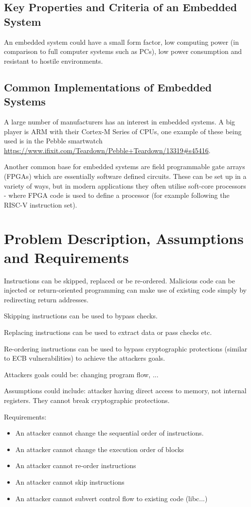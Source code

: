 \subsection{Key Properties and Criteria of an Embedded System}\label{propertiesEmbeddedSystems}
An embedded system could have a small form factor, low computing power (in comparison to full computer systems such as PCs), low power consumption and resistant to hostile environments.

\subsection{Common Implementations of Embedded Systems}\label{implementationsEmbeddedSystems}
A large number of manufacturers has an interest in embedded systems. A big player is ARM with their Cortex-M Series of CPUs, one example of these being used is in the Pebble smartwatch \url{https://www.ifixit.com/Teardown/Pebble+Teardown/13319#s45416}.

Another common base for embedded systems are field programmable gate arrays (FPGAs) which are essentially software defined circuits. These can be set up in a variety of ways, but in modern applications they often utilise soft-core processors - where FPGA code is used to define a processor (for example following the RISC-V instruction set).

\section{Problem Description, Assumptions and Requirements}

Instructions can be skipped, replaced or be re-ordered. Malicious code can be injected or return-oriented programming can make use of existing code simply by redirecting return addresses. 

Skipping instructions can be used to bypass checks.

Replacing instructions can be used to extract data or pass checks etc.

Re-ordering instructions can be used to bypass cryptographic protections (similar to ECB vulnerabilities) to achieve the attackers goals.

Attackers goals could be: changing program flow, ...

Assumptions could include: attacker having direct access to memory, not internal registers. They cannot break cryptographic protections.

Requirements: 
\begin{itemize}
	\item An attacker cannot change the sequential order of instructions.
	\item An attacker cannot change the execution order of blocks
	\item An attacker cannot re-order instructions
	\item An attacker cannot skip instructions
	\item An attacker cannot subvert control flow to existing code (libc...)
\end{itemize}

